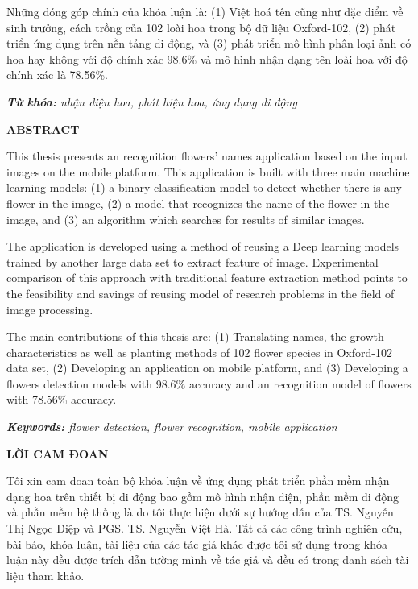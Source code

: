 \documentclass[12pt]{report}
\begin{document}
		Những đóng góp chính của khóa luận là: (1) Việt hoá tên cũng như đặc điểm về sinh trưởng, cách trồng của 102 loài hoa trong bộ dữ liệu Oxford-102, (2) phát triển ứng dụng trên nền tảng di động, và (3) phát triển mô hình phân loại ảnh có hoa hay không với độ chính xác 98.6\% và mô hình nhận dạng tên loài hoa với độ chính xác là 78.56\%.																			
																								
		\noindent \textit{\textbf{Từ khóa:} nhận diện hoa, phát hiện hoa, ứng dụng di động}
																								
		\newpage
		\begin{center}
			\textbf{\large ABSTRACT}
		\end{center}
																								
		This thesis presents an recognition flowers’ names application based on the input images on the mobile platform. This application is built with three main machine learning models: (1) a binary classification model to detect whether there is any flower in the image, (2) a model that recognizes the name of the flower in the image, and (3) an algorithm which searches for results of similar images. 
																								
		The application is developed using a method of reusing a Deep learning models trained by another large data set to extract feature of image. Experimental comparison of this approach with traditional feature extraction method points to the feasibility and savings of reusing model of research problems in the field of image processing.
																								
		The main contributions of this thesis are: (1) Translating names, the growth characteristics as well as planting methods of 102 flower species in Oxford-102 data set, (2) Developing an application on mobile platform, and (3) Developing a flowers detection models with 98.6\% accuracy and an recognition model of flowers with 78.56\% accuracy.
																								
																								
		\noindent \textit{\textbf{Keywords:} flower detection, flower recognition, mobile application}
																								
		\newpage
		\begin{center}
			\textbf{\large LỜI CAM ĐOAN}
		\end{center}
		Tôi xin cam đoan toàn bộ khóa luận về ứng dụng phát triển phần mềm nhận dạng hoa trên thiết bị di động bao gồm mô hình nhận diện, phần mềm di động và phần mềm hệ thống là do tôi thực hiện dưới sự hướng dẫn của TS. Nguyễn Thị Ngọc Diệp và PGS. TS. Nguyễn Việt Hà. Tất cả các công trình nghiên cứu, bài báo, khóa luận, tài liệu của các tác giả khác được tôi sử dụng trong khóa luận này đều được trích dẫn tường mình về tác giả và đều có trong danh sách tài liệu tham khảo.
																								
\end{document}
